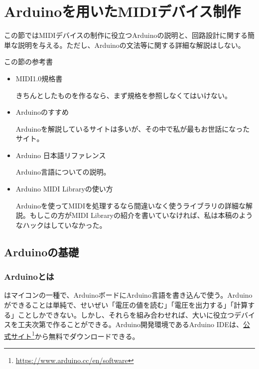 \documentclass[uplatex, 10pt, dvipdfmx]{jsarticle}
\numberwithin{equation}{section}
\newcommand{\emphj}[1]{\textbf{\textrm{\textgt{{#1}}}}}
\begin{document}
\section{Arduinoを用いたMIDIデバイス制作}
この節ではMIDIデバイスの制作に役立つArduinoの説明と、回路設計に関する簡単な説明を与える。ただし、Arduinoの文法等に関する詳細な解説はしない。
\begin{itembox}{この節の参考書}
\begin{itemize}
\item MIDI1.0規格書\cite{規格}

きちんとしたものを作るなら、まず規格を参照しなくてはいけない。

\item Arduinoのすすめ\cite{Arduinoのすすめ}

Arduinoを解説しているサイトは多いが、その中で私が最もお世話になったサイト。

\item Arduino 日本語リファレンス\cite{Arduinoリファレンス}

Arduino言語についての説明。

\item Arduino MIDI Libraryの使い方\cite{ArduinoMIDILib}

Arduinoを使ってMIDIを処理するなら間違いなく使うライブラリの詳細な解説。もしこの方がMIDI Libraryの紹介を書いていなければ、私は本稿のようなハックはしていなかった。
\end{itemize}
\end{itembox}

\subsection{Arduinoの基礎}
\subsubsection{Arduinoとは}
\emphj{Arduino}はマイコンの一種で、ArduinoボードにArduino言語を書き込んで使う。Arduinoができることは単純で、せいぜい「電圧の値を読む」「電圧を出力する」「計算する」ことしかできない。しかし、それらを組み合わせれば、大いに役立つデバイスを工夫次第で作ることができる。Arduino開発環境であるArduino IDEは、\href{https://www.arduino.cc/en/software}{公式サイト}\footnote{\url{https://www.arduino.cc/en/software}}から無料でダウンロードできる。
\end{document}
